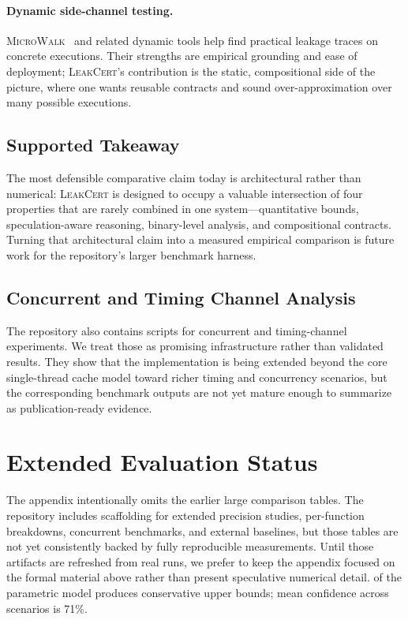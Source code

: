 \documentclass{article}
\theoremstyle{definition}
\theoremstyle{remark}
\newcommand{\MicroWalk}{\textsc{MicroWalk}}
\begin{document}
\paragraph{Dynamic side-channel testing.}
\MicroWalk{}~\cite{wichelmann2018microwalk} and related dynamic tools help find
practical leakage traces on concrete executions. Their strengths are empirical
grounding and ease of deployment; \textsc{LeakCert}'s contribution is the
static, compositional side of the picture, where one wants reusable contracts
and sound over-approximation over many possible executions.

\subsection{Supported Takeaway}

The most defensible comparative claim today is architectural rather than
numerical: \textsc{LeakCert} is designed to occupy a valuable intersection of
four properties that are rarely combined in one system---quantitative bounds,
speculation-aware reasoning, binary-level analysis, and compositional
contracts. Turning that architectural claim into a measured empirical
comparison is future work for the repository's larger benchmark harness.

\subsection{Concurrent and Timing Channel Analysis}
\label{sec:eval-concurrent}

The repository also contains scripts for concurrent and timing-channel
experiments. We treat those as promising infrastructure rather than validated
results. They show that the implementation is being extended beyond the core
single-thread cache model toward richer timing and concurrency scenarios, but
the corresponding benchmark outputs are not yet mature enough to summarize as
publication-ready evidence.

\section{Extended Evaluation Status}
\label{app:extended}

The appendix intentionally omits the earlier large comparison tables. The
repository includes scaffolding for extended precision studies, per-function
breakdowns, concurrent benchmarks, and external baselines, but those tables are
not yet consistently backed by fully reproducible measurements. Until those
artifacts are refreshed from real runs, we prefer to keep the appendix focused
on the formal material above rather than present speculative numerical detail.
of the parametric model produces conservative upper bounds; mean confidence
across scenarios is 71\%.
\end{document}
